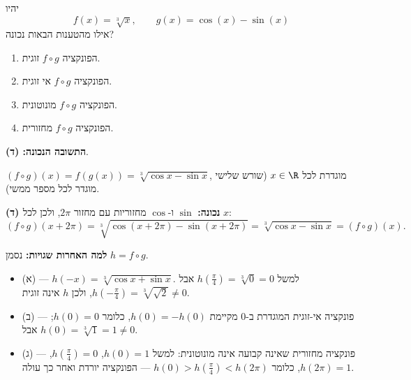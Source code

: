 
\begin{question}
יהיו
\[
f(x)=\sqrt[3]{x},\qquad g(x)=\cos(x)-\sin(x)
\]
אילו מהטענות הבאות נכונה?
\begin{enumerate}
  \item הפונקציה $f\circ g$ זוגית.
  \item הפונקציה $f\circ g$ אי זוגית.
  \item הפונקציה $f\circ g$ מונוטונית.
  \item הפונקציה $f\circ g$ מחזורית.
\end{enumerate}
\end{question}

\begin{solution}
\textbf{התשובה הנכונה: (ד)}.

$(f\circ g)(x)=f(g(x))=\sqrt[3]{\cos x-\sin x}$, מוגדרת לכל $x\in\R$ (שורש שלישי מוגדר לכל מספר ממשי).

\textbf{(ד) נכונה:} $\sin$ ו-$\cos$ מחזוריות עם מחזור $2\pi$, ולכן לכל $x$:
\[
(f\circ g)(x+2\pi)=\sqrt[3]{\cos(x+2\pi)-\sin(x+2\pi)}=\sqrt[3]{\cos x-\sin x}=(f\circ g)(x).
\]

\textbf{למה האחרות שגויות:} נסמן $h=f\circ g$.
\begin{itemize}
  \item (א) — $h(-x)=\sqrt[3]{\cos x+\sin x}$. למשל $h\!\left(\frac\pi4\right)=\sqrt[3]{0}=0$ אבל $h\!\left(-\frac\pi4\right)=\sqrt[3]{\sqrt2}\neq0$, ולכן $h$ אינה זוגית.
  \item (ב) — פונקציה אי-זוגית המוגדרת ב-0 מקיימת $h(0)=-h(0)$, כלומר $h(0)=0$; אבל $h(0)=\sqrt[3]{1}=1\neq0$.
  \item (ג) — פונקציה מחזורית שאינה קבועה אינה מונוטונית: למשל $h(0)=1$, $h\!\left(\frac\pi4\right)=0$, $h(2\pi)=1$, כלומר $h(0)>h(\frac\pi4)<h(2\pi)$ — הפונקציה יורדת ואחר כך עולה.
\end{itemize}
\end{solution}
